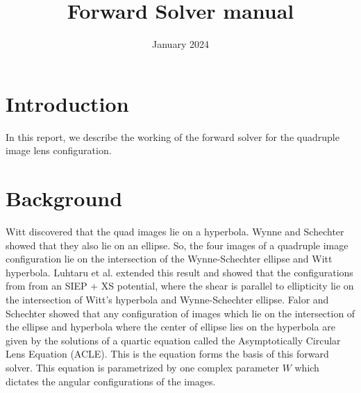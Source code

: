 \documentclass{article}
\title{Forward Solver manual}
\author{}
\date{January 2024}
\begin{document}
\maketitle

\section{Introduction}
In this report, we describe the working of the forward solver for the quadruple image lens configuration. 

\section{Background}
Witt discovered that the quad images lie on a hyperbola. Wynne and Schechter showed that they also lie on an ellipse. So, the four images of a quadruple image configuration lie on the intersection of the Wynne-Schechter ellipse and Witt hyperbola. Luhtaru et al. extended this result and showed that the configurations from from an SIEP + XS potential, where the shear is parallel to ellipticity lie on the intersection of Witt's hyperbola and Wynne-Schechter ellipse. Falor and Schechter showed that any configuration of images which lie on the intersection of the ellipse and hyperbola where the center of ellipse lies on the hyperbola are given by the solutions of a quartic equation called the Asymptotically Circular Lens Equation (ACLE). This is the equation forms the basis of this forward solver. This equation is parametrized by one complex parameter $W$ which dictates the angular configurations of the images.
\end{document}
